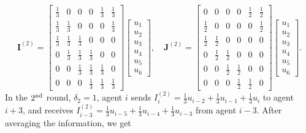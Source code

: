 \documentclass{article}
\newcommand{\vI}{\mathbf{I}}
\newcommand{\vJ}{\mathbf{J}}
\theoremstyle{plain}
\theoremstyle{definition}
\begin{document}
$$
\vI^{(2)}
=
\left[
\begin{array}{cccccc}
    \frac{1}{3} & 0 & 0 & 0 & \frac{1}{3} & \frac{1}{3} \\
    \frac{1}{3} & \frac{1}{3} & 0 & 0 & 0 & \frac{1}{3} \\
    \frac{1}{3} & \frac{1}{3} & \frac{1}{3} & 0 & 0 & 0 \\
    0 & \frac{1}{3} & \frac{1}{3} & \frac{1}{3} & 0 & 0 \\
    0 & 0 & \frac{1}{3} & \frac{1}{3} & \frac{1}{3} & 0 \\
    0 & 0 & 0 & \frac{1}{3} & \frac{1}{3} & \frac{1}{3} 
\end{array}
\right]
\left[
\begin{array}{c}
     u_1  \\
     u_2  \\
     u_3  \\
     u_4  \\
     u_5  \\
     u_6
\end{array}
\right],\quad
\vJ^{(2)}
=
\left[
\begin{array}{cccccc}
    0 & 0 & 0 & 0 & \frac{1}{2} & \frac{1}{2} \\
    \frac{1}{2} & 0 & 0 & 0 & 0 & \frac{1}{2} \\
    \frac{1}{2} & \frac{1}{2} & 0 & 0 & 0 & 0 \\
    0 & \frac{1}{2} & \frac{1}{2} & 0 & 0 & 0 \\
    0 & 0 & \frac{1}{2} & \frac{1}{2} & 0 & 0 \\
    0 & 0 & 0 & \frac{1}{2} & \frac{1}{2} & 0 
\end{array}
\right]
\left[
\begin{array}{c}
     u_1  \\
     u_2  \\
     u_3  \\
     u_4  \\
     u_5  \\
     u_6
\end{array}
\right].
$$
In the $2^{\textup{nd}}$ round, $\delta_2=1$, agent $i$ sends $I^{(2)}_i=\frac{1}{3}u_{i-2}+\frac{1}{3}u_{i-1}+\frac{1}{3}u_{i}$ to agent $i+3$, and receives $I^{(2)}_{i-3}=\frac{1}{3}u_{i-5}+\frac{1}{3}u_{i-4}+\frac{1}{3}u_{i-3}$ from agent $i-3$. After averaging the information, we get
\end{document}
